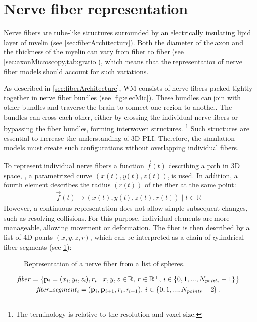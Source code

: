 \section{Nerve fiber representation}
\label{sec:nerve_fiber_representation}
%
Nerve fibers are tube-like structures surrounded by an electrically insulating lipid layer of myelin (see \cref{sec:fiberArchitecture}).
Both the diameter of the axon and the thickness of the myelin can vary from fiber to fiber (see \cref{sec:axonMicroscopy,tab:gratio}), which
means that the representation of nerve fiber models should account for such variations.
\par
%
As described in \cref{sec:fiberArchitecture}, \ac{WM} consists of nerve fibers packed tightly together in nerve fiber bundles (see \cref{fig:elecMic}).
These bundles can join with other bundles and traverse the brain to connect one region to another.
The bundles can cross each other, either by crossing the individual nerve fibers or bypassing the fiber bundles, forming interwoven structures.
\footnote{The terminology  is relative to the resolution and voxel size.}
Such structures are essential to increase the understanding of \ac{3D-PLI}.
Therefore, the simulation models must create such configurations without overlapping individual fibers.
\par
%
To represent individual nerve fibers a function $\vec{f}(t)$ describing a path in 3D space, \ie{}, a parametrized curve $(x(t), y(t), z(t))$, is used.
In addition, a fourth element describes the radius $(r(t))$ of the fiber at the same point:
% 
\begin{align}
\vec{f}(t) \rightarrow (x(t), y(t), z(t), r(t)) \; | \; t \in \mathbb{R}
\end{align}
% 
However, a continuous representation does not allow simple subsequent changes, such as resolving collisions.
For this purpose, individual elements are more manageable, allowing movement or deformation.
The fiber is then described by a list of 4D points $(x,y,z,r)$, which can be interpreted as a chain of cylindrical fiber segments (see \cref{fig:fiberReb}):
%
\begin{figure}[!t]
    \setlength{\tikzwidth}{0.85\textwidth}
    \centering
	\caption[]{Representation of a nerve fiber from a list of spheres.}
	\label{fig:fiberReb}
\end{figure}
% 
\begin{align}
\begin{gathered}
\mathit{fiber} = \left\{ \vec{p}_i=(x_i,y_i,z_i), r_i \mid x,y,z \in \mathbb{R}, \, r \in \mathbb{R^+}, \, i \in \{0,1,...,N_{\mathit{points}}-1\}\right\} \\
\mathit{fiber\tum{}segment}_i = (\vec{p}_i, \vec{p}_{i+1}, r_i, r_{i+1}), \, i \in \{0,1,...,N_{\mathit{points}}-2\} \, .
\end{gathered}
\end{align}

